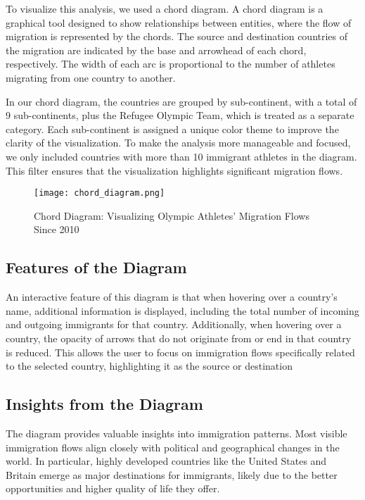 To visualize this analysis, we used a chord diagram. A chord diagram is a graphical tool designed to show relationships between entities, where the flow of migration is represented by the chords. The source and destination countries of the migration are indicated by the base and arrowhead of each chord, respectively. The width of each arc is proportional to the number of athletes migrating from one country to another.

In our chord diagram, the countries are grouped by sub-continent, with a total of 9 sub-continents, plus the Refugee Olympic Team, which is treated as a separate category. Each sub-continent is assigned a unique color theme to improve the clarity of the visualization. To make the analysis more manageable and focused, we only included countries with more than 10 immigrant athletes in the diagram. This filter ensures that the visualization highlights significant migration flows.

\begin{figure}[ht]
    \centering
    \texttt{[image: chord\_diagram.png]}
    \caption{Chord Diagram: Visualizing Olympic Athletes' Migration Flows Since 2010}
    \label{fig:choropleth_map}
\end{figure}

\subsection{Features of the Diagram}
An interactive feature of this diagram is that when hovering over a country's name, additional information is displayed, including the total number of incoming and outgoing immigrants for that country. Additionally, when hovering over a country, the opacity of arrows that do not originate from or end in that country is reduced. This allows the user to focus on immigration flows specifically related to the selected country, highlighting it as the source or destination
\subsection{Insights from the Diagram}
The diagram provides valuable insights into immigration patterns. Most visible immigration flows align closely with political and geographical changes in the world. In particular, highly developed countries like the United States and Britain emerge as major destinations for immigrants, likely due to the better opportunities and higher quality of life they offer.

